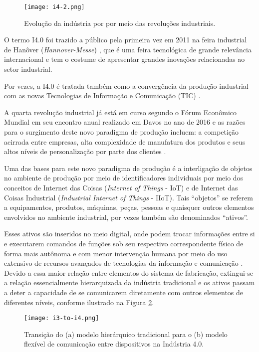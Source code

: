 	\begin{figure}[hbt!]
		\centering
		\caption{Evolução da indústria por por meio das revoluções industriais.}
		\texttt{[image: i4-2.png]}
		\label{fig:i4-2}
	\end{figure}

	O termo I4.0 foi trazido a público pela primeira vez em 2011 na feira industrial de Hanôver (\textit{Hannover-Messe}) \cite{kagermann2011industrie}, que é uma feira tecnológica de grande relevância internacional e tem o costume de apresentar grandes inovações relacionadas ao setor industrial.

	Por vezes, a I4.0 é tratada também como a convergência da produção industrial com as novas Tecnologias de Informação e Comunicação (TIC) \cite{hermann2016design}.

	A quarta revolução industrial já está em curso segundo o Fórum Econômico Mundial \cite{schwab2016fourth} em seu encontro anual realizado em Davos no ano de 2016 e as razões para o surgimento deste novo paradigma de produção incluem: a competição acirrada entre empresas, alta complexidade de manufatura dos produtos e seus altos níveis de personalização por parte dos clientes \cite{bordeleau2018bi, vaidya2018industryfour}.

	Uma das bases para este novo paradigma de produção é a interligação de objetos no ambiente de produção por meio de identificadores individuais por meio dos conceitos de Internet das Coisas (\textit{Internet of Things} - IoT) e de Internet das Coisas Industrial (\textit{Industrial Internet of Things} - IIoT). Tais ``objetos'' se referem a equipamentos, produtos, máquinas, peças, pessoas e quaisquer outros elementos envolvidos no ambiente industrial, por vezes também são denominados ``ativos''.
	
	Esses ativos são inseridos no meio digital, onde podem trocar informações entre si e executarem comandos de funções sob seu respectivo correspondente físico de forma mais autônoma e com menor intervenção humana por meio do uso extensivo de recursos avançados de tecnologias da informação e comunicação \cite{adolph2018roadmap}. Devido a essa maior relação entre elementos do sistema de fabricação, extingui-se a relação essencialmente hierarquizada da indústria tradicional e os ativos passam a deter a capacidade de se comunicarem diretamente com outros elementos de diferentes níveis, conforme ilustrado na Figura \ref{fig:i3-to-i4}.
	
	\begin{figure}[hbt!]
		\centering
		\caption{Transição do (a) modelo hierárquico tradicional para o (b) modelo flexível de comunicação entre dispositivos na Indústria 4.0.}
		\texttt{[image: i3-to-i4.png]}
		\label{fig:i3-to-i4}
	\end{figure}

